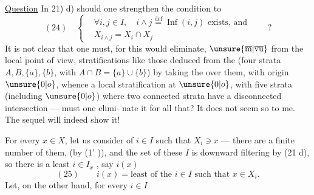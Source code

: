 \uline{Question} In 21) d) should one
strengthen the condition to
\[
(24)\quad\left\{\begin{aligned}
&\forall i,j\in I,\quad i\wedge j\overset{\mathrm{def}}{=}\operatorname{Inf}(i,j)\text{ exists, and}\\
&X_{i\wedge j}=X_i\cap X_j
\end{aligned}\right.\qquad ?
\]
It is not clear that one must, for
this would eliminate, $\unsure{\overline{\mathrm{m}}|\overline{\mathrm{vu}}}$ from the local point of view,
stratifications like those deduced from the 
(four strata $A,B,\{a\},\{b\}$, with
$A\cap B=\{a\}\cup\{b\}$) by taking the
 over them,  with origin $\unsure{0|o}$,
whence a local stratification at $\unsure{0|o}$, with five
strata (including $\unsure{0|o}$) where two connected strata have
a disconnected intersection --- must one elimi-
nate it for all that? It  does not
seem so to me. The sequel will indeed show it!

For every $x\in X$, let us consider  of $i\in I$ such
that $X_i\ni x$ --- there are a finite number of them, 
(by (1' )), and the set of these $I$ is downward
filtering by (21 d), so there is
a least $i\in I_x$ , say $i(x)$
\[
(25)\qquad i(x)=\text{least of the }i\in I\text{ such that }x\in X_i.
\]
Let, on the other hand, for every $i\in I$
